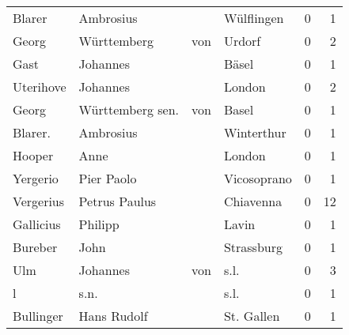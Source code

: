 \begin{center}
\begin{tiny}
\begin{longtabu}{llllrr}
                   Blarer &                          Ambrosius &             &                                  Wülflingen &          0 &         1 \\
                    Georg &                        Württemberg &         von &                                      Urdorf &          0 &         2 \\
                     Gast &                           Johannes &             &                                       Bäsel &          0 &         1 \\
                Uterihove &                           Johannes &             &                                      London &          0 &         2 \\
                    Georg &                   Württemberg sen. &         von &                                       Basel &          0 &         1 \\
                  Blarer. &                          Ambrosius &             &                                  Winterthur &          0 &         1 \\
                   Hooper &                               Anne &             &                                      London &          0 &         1 \\
                 Yergerio &                         Pier Paolo &             &                                 Vicosoprano &          0 &         1 \\
                Vergerius &                      Petrus Paulus &             &                                   Chiavenna &          0 &        12 \\
                Gallicius &                            Philipp &             &                                       Lavin &          0 &         1 \\
                  Bureber &                               John &             &                                  Strassburg &          0 &         1 \\
                      Ulm &                           Johannes &         von &                                        s.l. &          0 &         3 \\
                        l &                               s.n. &             &                                        s.l. &          0 &         1 \\
                Bullinger &                        Hans Rudolf &             &                                  St. Gallen &          0 &         1 \\

\end{longtabu}
\end{tiny}
\end{center}
